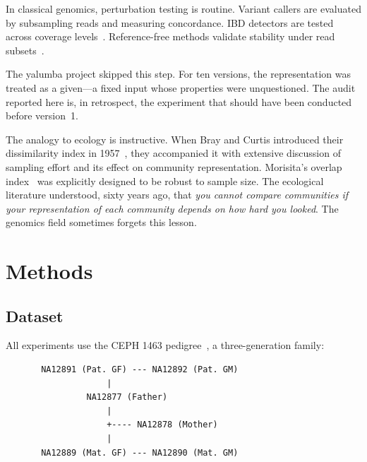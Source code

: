 \documentclass{../yalumba}
\begin{document}

In classical genomics, perturbation testing is routine.  Variant callers
are evaluated by subsampling reads and measuring concordance.  IBD
detectors are tested across coverage
levels~\cite{browning2012ibd, browning2013refinedibd}.
Reference-free methods validate stability under read
subsets~\cite{ondov2016mash, brinda2023phylogenetic}.

The yalumba project skipped this step.  For ten versions, the
representation was treated as a given---a fixed input whose properties
were unquestioned.  The audit reported here is, in retrospect, the
experiment that should have been conducted before version~1.

The analogy to ecology is instructive.  When Bray and Curtis introduced
their dissimilarity index in 1957~\cite{bray1957}, they accompanied it
with extensive discussion of sampling effort and its effect on community
representation.  Morisita's overlap index~\cite{morisita1959} was
explicitly designed to be robust to sample size.  The ecological
literature understood, sixty years ago, that \emph{you cannot compare
communities if your representation of each community depends on how hard
you looked}.  The genomics field sometimes forgets this lesson.


\section{Methods}
\label{sec:methods}

\subsection{Dataset}

All experiments use the CEPH 1463 pedigree~\cite{ceph1463}, a
three-generation family:

\begin{pedigree}
\begin{verbatim}
       NA12891 (Pat. GF) --- NA12892 (Pat. GM)
                    |
                NA12877 (Father)
                    |
                    +---- NA12878 (Mother)
                    |
       NA12889 (Mat. GF) --- NA12890 (Mat. GM)
\end{verbatim}
\end{pedigree}
\end{document}
